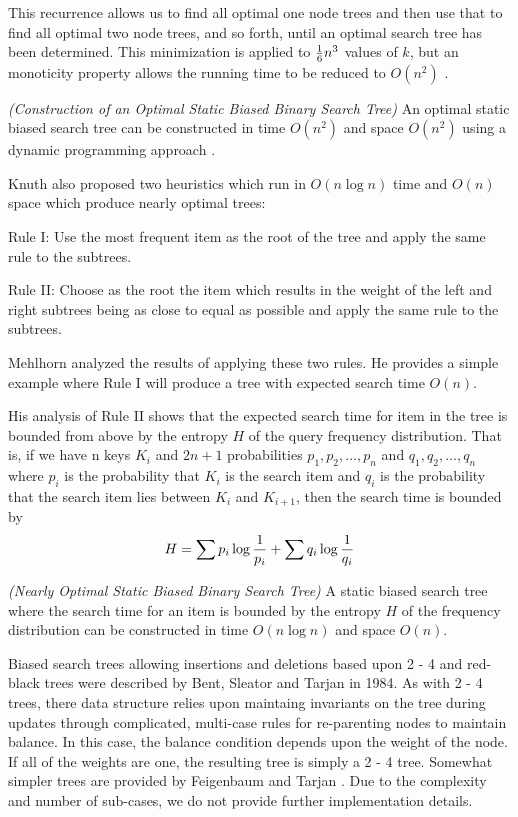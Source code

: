 \documentclass[mcs]{scsthesis}
\begin{document}
This recurrence allows us to find all optimal one node trees and then use that
to find all optimal two node trees, and so forth, until an optimal search
tree has been determined. This minimization is applied to \({1\over{6}} n^{3} \)
values of \( k \), but an monoticity property allows the running time
to be reduced to \( O(n^2) \) \cite{knuth}.

\begin{thm} \emph{(Construction of an Optimal Static Biased Binary Search Tree)} 
An optimal static biased search tree can be constructed in time \(O(n^2)\) and
space \(O(n^2)\) using a dynamic programming approach \cite{knuth}.
\end{thm}

Knuth also proposed two heuristics which run in \(O(n \log n)\) time and
\(O(n)\) space which produce nearly optimal trees:

Rule I: Use the most frequent item as the root of the tree and apply the same
rule to the subtrees.

Rule II: Choose as the root the item which results in the weight of the left
and right subtrees being as close to equal as possible and apply the same
rule to the subtrees. 

Mehlhorn \cite{mehlhorn} analyzed the results of applying these two rules. He
provides a simple example where Rule I will produce a tree with expected
search time \(O(n)\).

His analysis of Rule II shows that the expected search time for item in the tree
is bounded from above by the entropy \(H\) of the query frequency distribution.
That is, if we have n keys \(K_i\) and \(2n + 1\) probabilities
\(p_1, p_2, ..., p_n\) and \(q_1, q_2, ..., q_n\) where \(p_i\) is the
probability that \(K_i\) is the search item and \(q_i\) is the
probability that the search item lies between \(K_i\) and \(K_{i+1}\), then
the search time is bounded by
$$
H = \sum{ p_i \log{1 \over p_i}} + \sum{ q_i \log{1 \over q_i}}
$$

\begin{thm} \emph{(Nearly Optimal Static Biased Binary Search Tree)} 
A static biased search tree where the search time for an item is bounded by
the entropy \(H\) of the frequency distribution can be constructed in time
\(O(n \log n)\) and space \(O(n)\).
\end{thm}

Biased search trees allowing insertions and deletions based upon 2 - 4 and
red-black trees were described by Bent, Sleator and Tarjan \cite{bst} in 1984.
As with 2 - 4 trees, there data structure relies upon maintaing invariants
on the tree during updates through complicated, multi-case rules for
re-parenting nodes to maintain balance. In this case, the balance condition
depends upon the weight of the node. If all of the weights are one, the
resulting tree is simply a 2 - 4 tree. Somewhat simpler trees are provided
by Feigenbaum and Tarjan \cite{bst2}. Due to the complexity and number of
sub-cases, we do not provide further implementation details.
\end{document}
